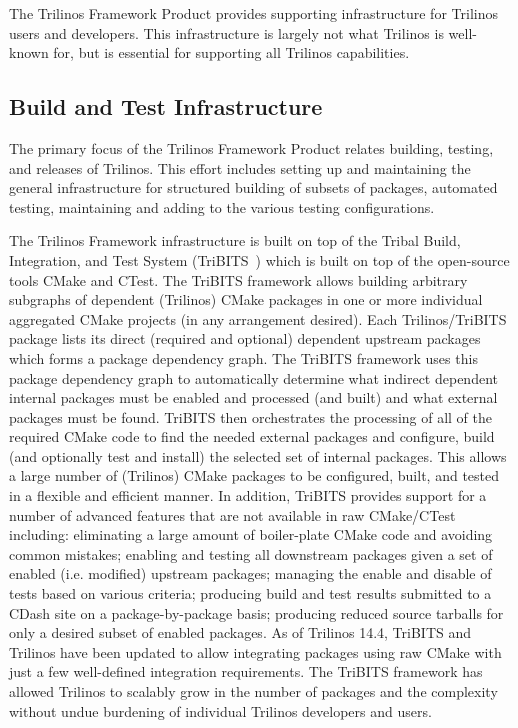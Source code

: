 
The Trilinos Framework Product provides supporting infrastructure for Trilinos users and developers. This infrastructure is largely not what Trilinos is well-known for, but is essential for supporting all Trilinos capabilities.

\subsection{Build and Test Infrastructure}

The primary focus of the Trilinos Framework Product relates building, testing, and releases of Trilinos. This effort includes setting up and maintaining the general infrastructure for structured building of subsets of packages, automated testing, maintaining and adding to the various testing configurations.

The Trilinos Framework infrastructure is built on top of the Tribal Build, Integration, and Test System (TriBITS~\cite{Bartlett2014}) which is built on top of the open-source tools CMake and CTest.
The TriBITS framework allows building arbitrary subgraphs of dependent (Trilinos) CMake packages in one or more individual aggregated CMake projects (in any arrangement desired).
Each Trilinos/TriBITS package lists its direct (required and optional) dependent upstream packages which forms a package dependency graph.
The TriBITS framework uses this package dependency graph to automatically determine what indirect dependent internal packages must be enabled and processed (and built) and what external packages must be found.
TriBITS then orchestrates the processing of all of the required CMake code to find the needed external packages and configure, build (and optionally test and install) the selected set of internal packages.
This allows a large number of (Trilinos) CMake packages to be configured, built, and tested in a flexible and efficient manner.
In addition, TriBITS provides support for a number of advanced features that are not available in raw CMake/CTest including: eliminating a large amount of boiler-plate CMake code and avoiding common mistakes; enabling and testing all downstream packages given a set of enabled (i.e. modified) upstream packages; managing the enable and disable of tests based on various criteria; producing build and test results submitted to a CDash site on a package-by-package basis; producing reduced source tarballs for only a desired subset of enabled packages.
As of Trilinos 14.4, TriBITS and Trilinos have been updated to allow integrating packages using raw CMake with just a few well-defined integration requirements.
The TriBITS framework has allowed Trilinos to scalably grow in the number of packages and the complexity without undue burdening of individual Trilinos developers and users.

